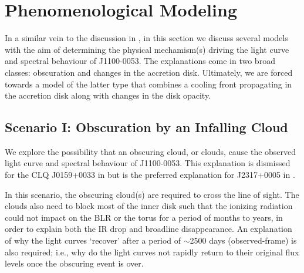 \documentclass[a4paper,fleqn,usenatbib]{mnras}
\begin{document}
\section{Phenomenological Modeling} 
In a similar vein to the discussion in \cite{Stern2018}, in this
section we discuss several models with the aim of determining the
physical mechamism(s) driving the light curve and spectral behaviour
of J1100-0053. The explanations come in two broad classes: obscuration
and changes in the accretion disk. Ultimately, we are forced towards
a model of the latter type that combines a cooling front propagating
in the accretion disk along with changes in the disk opacity.

\subsection{Scenario I: Obscuration by an Infalling Cloud}
We explore the possibility that an obscuring cloud, or clouds, cause
the observed light curve and spectral behaviour of J1100-0053. This
explanation is dismissed for the CLQ J0159+0033 in \citet{LaMassa2015}
but is the preferred explanation for J2317+0005 in \citet{Guo2016}.

In this scenario, the obscuring cloud(s) are required to cross the line
of sight. The clouds also need to block most of the inner disk such
that the ionizing radiation could not impact on the BLR or the torus
for a period of months to years, in order to explain both the IR drop and
broadline disappearance. An explanation of why the light curves
`recover' after a period of $\sim$2500 days (observed-frame) is also
required; i.e., why do the light curves not rapidly return to their
original flux levels once the obscuring event is over.
\end{document}
